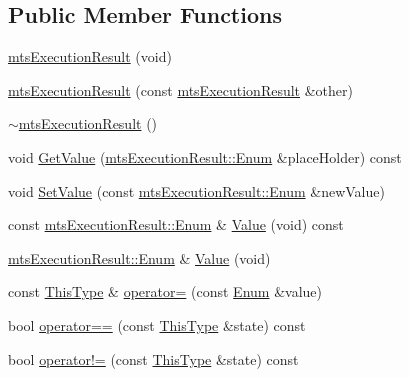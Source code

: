\subsection*{Public Member Functions}
\begin{DoxyCompactItemize}
\item 
\hyperlink{classmts_execution_result_a7de70242d4fb1176a7466e9b4d6421c2}{mts\+Execution\+Result} (void)
\item 
\hyperlink{classmts_execution_result_ade865f12c4af4032cf1b4ed12924553e}{mts\+Execution\+Result} (const \hyperlink{classmts_execution_result}{mts\+Execution\+Result} \&other)
\item 
\hyperlink{classmts_execution_result_a709789da535ce58b0788478dd1c759f3}{$\sim$mts\+Execution\+Result} ()
\item 
void \hyperlink{classmts_execution_result_ac8bfd1c33448b22bb86f44d9369d27dd}{Get\+Value} (\hyperlink{classmts_execution_result_a10c4246c82ac99d88e5f716f79407b77}{mts\+Execution\+Result\+::\+Enum} \&place\+Holder) const 
\item 
void \hyperlink{classmts_execution_result_a331e5ea0f1fa9eb93debdbc6cbe6d1ec}{Set\+Value} (const \hyperlink{classmts_execution_result_a10c4246c82ac99d88e5f716f79407b77}{mts\+Execution\+Result\+::\+Enum} \&new\+Value)
\item 
const \hyperlink{classmts_execution_result_a10c4246c82ac99d88e5f716f79407b77}{mts\+Execution\+Result\+::\+Enum} \& \hyperlink{classmts_execution_result_a6e65daeab100e17cd3e26530ae92fc83}{Value} (void) const 
\item 
\hyperlink{classmts_execution_result_a10c4246c82ac99d88e5f716f79407b77}{mts\+Execution\+Result\+::\+Enum} \& \hyperlink{classmts_execution_result_ac5b1224e542a98a3a10ce261bcec0147}{Value} (void)
\item 
const \hyperlink{classmts_execution_result_a8b0081f3c70da65307a17faace94b176}{This\+Type} \& \hyperlink{classmts_execution_result_a56d99010cdc4fae5e010a7b0c400d390}{operator=} (const \hyperlink{classmts_execution_result_a10c4246c82ac99d88e5f716f79407b77}{Enum} \&value)
\item 
bool \hyperlink{classmts_execution_result_a6b9766d9a66f8b2d6aebc46fe6b411cd}{operator==} (const \hyperlink{classmts_execution_result_a8b0081f3c70da65307a17faace94b176}{This\+Type} \&state) const 
\item 
bool \hyperlink{classmts_execution_result_a3e263b0bac01b5ffbe56226d550df660}{operator!=} (const \hyperlink{classmts_execution_result_a8b0081f3c70da65307a17faace94b176}{This\+Type} \&state) const 

\end{DoxyCompactItemize}
